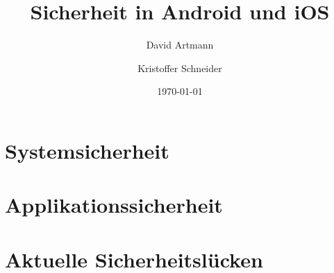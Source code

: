 \documentclass[aspectratio=169]{beamer}
\title{Sicherheit in Android und iOS}
\author{David Artmann\inst{1} \and Kristoffer Schneider\inst{1}}
\institute[Universities of]
{
\inst{1}
Hochschule für angewandte Wissenschaften\\
Würzburg-Schweinfurt
}
\date{\today}
\begin{document}



\section[Systemsicherheit]{Systemsicherheit}
	
\section[Applikationssicherheit]{Applikationssicherheit}
	
	
\section{Aktuelle Sicherheitslücken}
	
	
	
	
\end{document}

